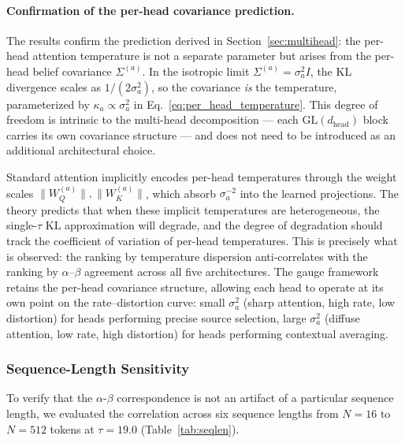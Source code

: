 \documentclass[twoside,11pt]{article}
\begin{document}
\paragraph{Confirmation of the per-head covariance prediction.}
The results confirm the prediction derived in Section~\ref{sec:multihead}: the per-head attention temperature is not a separate parameter but arises from the per-head belief covariance $\Sigma^{(a)}$. In the isotropic limit $\Sigma^{(a)} = \sigma_a^2 I$, the KL divergence scales as $1/(2\sigma_a^2)$, so the covariance \emph{is} the temperature, parameterized by $\kappa_a \propto \sigma_a^2$ in Eq.~\ref{eq:per_head_temperature}. This degree of freedom is intrinsic to the multi-head decomposition --- each $\mathrm{GL}(d_{\text{head}})$ block carries its own covariance structure --- and does not need to be introduced as an additional architectural choice.

Standard attention implicitly encodes per-head temperatures through the weight scales $\|W_Q^{(a)}\|, \|W_K^{(a)}\|$, which absorb $\sigma_a^{-2}$ into the learned projections. The theory predicts that when these implicit temperatures are heterogeneous, the single-$\tau$ KL approximation will degrade, and the degree of degradation should track the coefficient of variation of per-head temperatures. This is precisely what is observed: the ranking by temperature dispersion anti-correlates with the ranking by $\alpha$--$\beta$ agreement across all five architectures. The gauge framework retains the per-head covariance structure, allowing each head to operate at its own point on the rate--distortion curve: small $\sigma_a^2$ (sharp attention, high rate, low distortion) for heads performing precise source selection, large $\sigma_a^2$ (diffuse attention, low rate, high distortion) for heads performing contextual averaging.


\subsubsection{Sequence-Length Sensitivity}
\label{sec:seqlen}

To verify that the $\alpha$-$\beta$ correspondence is not an artifact of a particular sequence length, we evaluated the correlation across six sequence lengths from $N = 16$ to $N = 512$ tokens at $\tau = 19.0$ (Table~\ref{tab:seqlen}).
\end{document}
